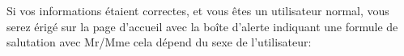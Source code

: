 \documentclass{article}
\begin{document}
\begin{enumerate}
\vspace{0.4cm}
\hspace*{-0.7in}
               \noindent{}
























	Si vos informations étaient correctes, et vous êtes un utilisateur normal, vous serez érigé sur la page d'accueil avec la boîte d'alerte indiquant une formule de salutation avec Mr/Mme cela dépend du sexe de l'utilisateur:



   
   
   
   \hspace*{-0.7in}
               \noindent{}




\end{enumerate}
\end{document}
